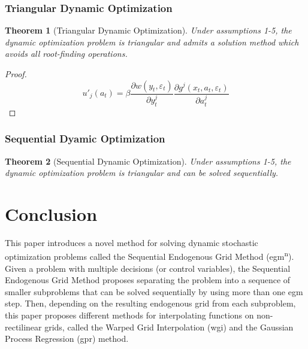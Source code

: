 \documentclass{article}
\newtheorem{theorem}{Theorem}[section]
\begin{document}
\subsubsection{Triangular Dynamic Optimization}

\begin{theorem}[Triangular Dynamic Optimization]Under assumptions 1-5, the dynamic optimization problem is triangular and admits a solution method which avoids all root-finding operations.

\end{theorem}\begin{proof}\begin{equation}
u'_j(a_t) = \beta \frac{\partial w(y_t, \varepsilon_t)}{\partial y^j_t} \frac{\partial g^j(x_t, a_t, \varepsilon_t)}{\partial a^j_t}
\end{equation}

\end{proof}\subsubsection{Sequential Dyamic Optimization}

\begin{theorem}[Sequential Dynamic Optimization]Under assumptions 1-5, the dynamic optimization problem is triangular and can be solved sequentially.

\end{theorem}\section{Conclusion}\label{conclusion}


This paper introduces a novel method for solving dynamic stochastic optimization problems called the Sequential Endogenous Grid Method (\acrshort{egm}\textsuperscript{n}). Given a problem with multiple decisions (or control variables), the Sequential Endogenous Grid Method proposes separating the problem into a sequence of smaller subproblems that can be solved sequentially by using more than one \acrshort{egm} step. Then, depending on the resulting endogenous grid from each subproblem, this paper proposes different methods for interpolating functions on non-rectilinear grids, called the Warped Grid Interpolation (\acrshort{wgi}) and the Gaussian Process Regression (\acrshort{gpr}) method.
\end{document}
